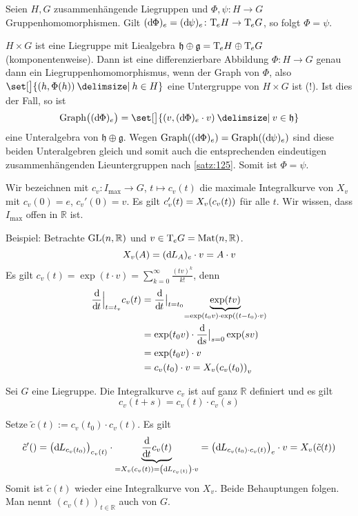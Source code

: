 \begin{korollar}
	Seien $H,G$ zusammenhängende Liegruppen und $\Phi, \psi \colon H \to G$ Gruppenhomomorphismen.
	Gilt $(\mathrm{d}\mkern-1.0mu \Phi)_e = (\mathrm{d}\mkern-1.0mu \psi)_e \colon \mathrm{T}\mkern-0.85mu_e H \to \mathrm{T}\mkern-0.85mu_e G$, so folgt $\Phi = \psi$.
\end{korollar}
\begin{beweis}
	$H \times G$ ist eine Liegruppe mit Liealgebra $\mathfrak{h} \oplus \mathfrak{g}= \mathrm{T}\mkern-0.85mu_e H \oplus \mathrm{T}\mkern-0.85mu_e G$ (komponentenweise).
	Dann ist eine differenzierbare Abbildung $\Phi \colon H \to G$ genau dann ein Liegruppenhomomorphismus, wenn der Graph von $\Phi$, also $\set[\big]{(h,\Phi(h)) \given h \in H}$ eine Untergruppe von $H \times G $ ist (!).
	Ist dies der Fall, so ist 
	\[
		\Graph \enbrace[\big]{(\mathd \Phi)_e} = \set[\big]{ \enbrace*{v, (\mathd \Phi)_e \cdot v} \given v \in \mathfrak{h}}
	\]
	eine Unteralgebra von $\mathfrak{h} \oplus \mathfrak{g}$.
	Wegen $\Graph \enbrace*{(\mathd \Phi)_e} = \Graph \enbrace*{(\mathd \psi)_e}$ sind diese beiden Unteralgebren gleich und somit auch die entsprechenden eindeutigen zusammenhängenden Lieuntergruppen nach \autoref{satz:125}.
	Somit ist $\Phi =\psi$.
\end{beweis}

Wir bezeichnen mit $c_v \colon I_{\max} \to G$, $t \mapsto c_v(t)$ die maximale Integralkurve von $X_v$ mit $c_v(0)=e$, $c_v'(0)=v$.
Es gilt $c_v'(t) = X_v \enbrace*{c_v(t)}$ für alle $t$.
Wir wissen, dass $I_{\max}$ offen in $\mathbb{R}$ ist.

Beispiel:
Betrachte $\operatorname{GL}(n,\mathbb{R})$ und $v \in \mathrm{T}\mkern-0.85mu_e G = \operatorname{Mat}(n,\mathbb{R})$.
\[
	X_v(A) = (\mathrm{d}\mkern-1.0mu L_A)_e \cdot v = A \cdot v
\]
Es gilt $c_v(t)= \exp(t \cdot v) = \sum_{k=0}^{\infty} \frac{(tv)^k}{k!}$, denn
\begin{align}
	\diffd{}{t}\Big|_{t=t_v} c_v(t) &= \diffd{}{t}\big|_{t=t_0} \Underbrace{\exp(t v)}{=\exp(t_0 v) \cdot \exp((t-t_0) \cdot v)} \\
	&= \exp(t_0 v) \cdot \diffd{}{s}\big|_{s=0} \exp(s v) \\
	&= \exp(t_0 v) \cdot v \\
	&= c_v(t_0) \cdot v = X_v \enbrace*{c_v(t_0)}_v
\end{align}

\begin{lemma}
	Sei $G$ eine Liegruppe.
	Die Integralkurve $c_v$ ist auf ganz $\mathbb{R}$ definiert und es gilt 
	\[
		c_v(t+s) = c_v(t) \cdot c_v(s)
	\]
\end{lemma}
\begin{beweis}
	Setze $\tilde{c}(t) := c_v(t_0) \cdot c_v(t)$.
	Es gilt 
	\begin{align}
		\tilde{c}'() = \enbrace*{\mathd L_{c_v(t_0)}}_{c_v(t)}  \cdot \Underbrace{\diffd{}{t} c_v(t)}{= X_v \enbrace*{c_v(t)} = \enbrace*{\mathd L_{c_v(t)}} \cdot v} = \enbrace*{\mathd L_{c_v(t_0) \cdot c_v(t)}}_e \cdot v = X_v \enbrace*{\tilde{c}(t)}
	\end{align}
	Somit ist $\tilde{c}(t)$ wieder eine Integralkurve von $X_v$.
	Beide Behauptungen folgen.
	Man nennt $(c_v(t))_{t \in \mathbb{R}}$ auch  von $G$. 
\end{beweis}

